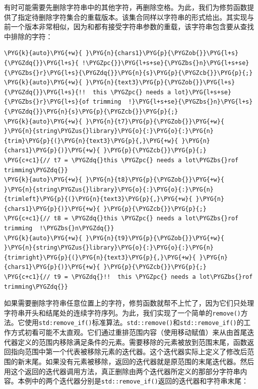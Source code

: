 
有时可能需要先删除字符串中的其他字符，再删除空格。为此，我们为修剪函数提供了指定待删除字符集合的重载版本。该集合同样以字符串的形式给出。其实现与前一个版本非常相似，因为和都有接受字符串参数的重载，该字符串包含要从查找中排除的字符：



\begin{codeblockbg}
\begin{Verbatim}[commandchars=\\\{\},breaklines=true,breakanywhere=true,fontsize=\codefont,xleftmargin=17bp]
\PYG{k}{auto}\PYG{+w}{ }\PYG{n}{chars1}\PYG{p}{\PYGZob{}}\PYG{l+s}{\PYGZdq{}}\PYG{l+s}{ !\PYGZpc{}}\PYG{l+s+se}{\PYGZbs{}n}\PYG{l+s+se}{\PYGZbs{}r}\PYG{l+s}{\PYGZdq{}}\PYG{n}{s}\PYG{p}{\PYGZcb{}}\PYG{p}{;}
\PYG{k}{auto}\PYG{+w}{ }\PYG{n}{text3}\PYG{p}{\PYGZob{}}\PYG{l+s}{\PYGZdq{}}\PYG{l+s}{!!  this \PYGZpc{} needs a lot}\PYG{l+s+se}{\PYGZbs{}r}\PYG{l+s}{of trimming  !}\PYG{l+s+se}{\PYGZbs{}n}\PYG{l+s}{\PYGZdq{}}\PYG{n}{s}\PYG{p}{\PYGZcb{}}\PYG{p}{;}
\PYG{k}{auto}\PYG{+w}{ }\PYG{n}{t7}\PYG{p}{\PYGZob{}}\PYG{+w}{ }\PYG{n}{string\PYGZus{}library}\PYG{o}{:}\PYG{o}{:}\PYG{n}{trim}\PYG{p}{(}\PYG{n}{text3}\PYG{p}{,}\PYG{+w}{ }\PYG{n}{chars1}\PYG{p}{)}\PYG{+w}{ }\PYG{p}{\PYGZcb{}}\PYG{p}{;}
\PYG{c+c1}{// t7 = \PYGZdq{}this \PYGZpc{} needs a lot\PYGZbs{}rof trimming\PYGZdq{}}
\PYG{k}{auto}\PYG{+w}{ }\PYG{n}{t8}\PYG{p}{\PYGZob{}}\PYG{+w}{ }\PYG{n}{string\PYGZus{}library}\PYG{o}{:}\PYG{o}{:}\PYG{n}{trimleft}\PYG{p}{(}\PYG{n}{text3}\PYG{p}{,}\PYG{+w}{ }\PYG{n}{chars1}\PYG{p}{)}\PYG{+w}{ }\PYG{p}{\PYGZcb{}}\PYG{p}{;}
\PYG{c+c1}{// t8 = \PYGZdq{}this \PYGZpc{} needs a lot\PYGZbs{}rof trimming  !\PYGZbs{}n\PYGZdq{}}
\PYG{k}{auto}\PYG{+w}{ }\PYG{n}{t9}\PYG{p}{\PYGZob{}}\PYG{+w}{ }\PYG{n}{string\PYGZus{}library}\PYG{o}{:}\PYG{o}{:}\PYG{n}{trimright}\PYG{p}{(}\PYG{n}{text3}\PYG{p}{,}\PYG{+w}{ }\PYG{n}{chars1}\PYG{p}{)}\PYG{+w}{ }\PYG{p}{\PYGZcb{}}\PYG{p}{;}
\PYG{c+c1}{// t9 = \PYGZdq{}!!  this \PYGZpc{} needs a lot\PYGZbs{}rof trimming\PYGZdq{}}
\end{Verbatim}
\end{codeblockbg}



如果需要删除字符串任意位置上的字符，修剪函数就帮不上忙了，因为它们只处理字符串开头和结尾处的连续字符序列。为此，我们实现了一个简单的\texttt{remove()}方法。它使用\texttt{std:\allowbreak{}remove\_\allowbreak{}if()}标准算法。\texttt{std::\allowbreak{}remove()}和\texttt{std::\allowbreak{}remove\_\allowbreak{}if()}的工作方式初看可能不太直观。它们通过重排范围内容（使用移动赋值）来从由首尾迭代器定义的范围内移除满足条件的元素。需要移除的元素被放到范围末尾，函数返回指向范围中第一个代表被移除元素的迭代器。这个迭代器实际上定义了修改后范围的新末尾。如果没有元素被移除，返回的迭代器就是原范围的末尾迭代器。然后用这个返回的迭代器调用方法，真正删除由两个迭代器所定义的那部分字符串内容。本例中的两个迭代器分别是\texttt{std::\allowbreak{}remove\_\allowbreak{}if()}返回的迭代器和字符串末尾：


